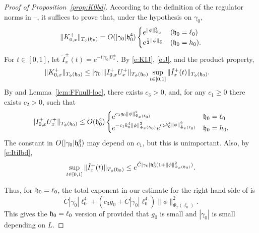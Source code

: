 \begin{proof}[Proof of Proposition~\ref{prop:K0bd}]
According to the definition of the
regulator norms in --,
it suffices to prove that, under the hypothesis on $\gamma_0$,
\begin{equation}
\label{e:K0bd}
  \|K^+_{0,x}\|_{T_\phi(\mathfrak{h}_0)} = O(|\gamma_0| \mathfrak{h}_0^4)
  \begin{cases}
  e^{\|\phi\|_{\Phi_x}^2} & (\mathfrak{h}_0=\ell_0)
  \\
  e^{\frac{{\sf t}}{2} \|\phi\|_{\tilde\Phi}} & (\mathfrak{h}_0=h_0).
  \end{cases}
\end{equation}
For $t \in [0,1]$, let $\tilde I^\pm_x(t) = e^{-t |\gamma_0| U^\pm_x}$.
By \eqref{e:KIJ}, \eqref{e:J}, and the product property,
\begin{align}
\label{e:K0x-est}
    \|K^+_{0,x}\|_{T_\phi(\mathfrak{h}_0)}
    & \le |\gamma_0| \|I^+_{0,x} U^+_x\|_{T_\phi(\mathfrak{h}_0)}
    \sup_{t\in [0, 1]} \|\tilde I^+_{x}(t)\|_{T_\phi(\mathfrak{h}_0)}.
\end{align}
By  and Lemma~\ref{lem:FFnull-loc},
there exists $c_3 > 0$, and, for any $c_1 \geq 0$ there exists $c_2 > 0$, such that
\begin{equation}
\label{e:Iupper-bis}
\|I^+_{0,x} U^+_x\|_{T_\phi(\mathfrak{h}_0)}
  \leq
O(\mathfrak{h}_0^4)
\begin{cases}
  e^{c_3 g_0  \|\phi\|^2_{\Phi_x(\ell_0)}}
    & \mathfrak{h}_0 = \ell_0 \\
  e^{-c_1 k_0^4 \|\phi\|^2_{\Phi_x(h_0)}} e^{c_2 k_0^4 \|\phi\|^2_{\tilde\Phi_x(\ell_0)}}
    & \mathfrak{h}_0 = h_0.
\end{cases}
\end{equation}
The constant in $O(|\gamma_0| \mathfrak{h}_0^4)$ may depend on $c_1$,
but this is unimportant.
Also, by \eqref{e:Itilbd},
\begin{equation}
\sup_{t\in[0,1]} \|\tilde I_{x}^+(t) \|_{T_\phi(\mathfrak{h}_0)}
  \le
e^{\tilde C |\gamma_0| \mathfrak{h}_0^4 (1+\|\phi\|^2_{\Phi_x(\mathfrak{h}_0)})}.
\end{equation}

Thus, for $\mathfrak{h}_0=\ell_0$,
the total exponent in our estimate for the right-hand side of 
is
\begin{equation}
    \tilde C |\gamma_0| \ell_0^4
       +(c_3 g_0 + \tilde C |\gamma_0| \ell_0^4) \|\phi\|^2_{\Phi_x(\ell_0)}
     .
\end{equation}
This gives the $\mathfrak{h}_0=\ell_0$ version of  provided that
$g_0$ is small and $|\gamma_0|$ is small depending on $L$.


\end{proof}
